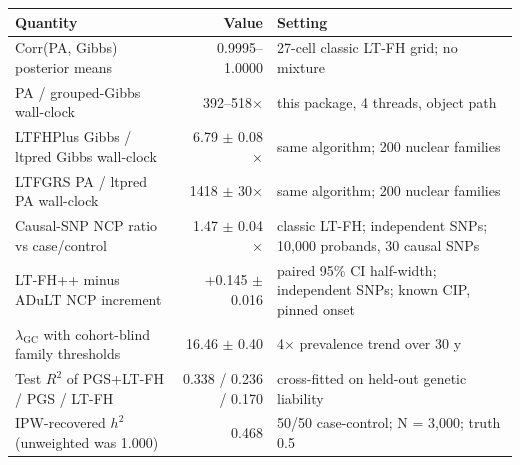 \begin{tabular}{@{}p{}rp{}@{}}
\toprule
Quantity & Value & Setting \\
\midrule
Corr(PA, Gibbs) posterior means & 0.9995--1.0000 & 27-cell classic LT-FH grid; no mixture \\
PA / grouped-Gibbs wall-clock & 392--518$\times$ & this package, 4 threads, object path \\
LTFHPlus Gibbs / ltpred Gibbs wall-clock & 6.79 $\pm$ 0.08$\times$ & same algorithm; 200 nuclear families \\
LTFGRS PA / ltpred PA wall-clock & 1418 $\pm$ 30$\times$ & same algorithm; 200 nuclear families \\
Causal-SNP NCP ratio vs case/control & 1.47 $\pm$ 0.04$\times$ & classic LT-FH; independent SNPs; 10,000 probands, 30 causal SNPs \\
LT-FH++ minus ADuLT NCP increment & +0.145 $\pm$ 0.016 & paired 95\% CI half-width; independent SNPs; known CIP, pinned onset \\
$\lambda_{\mathrm{GC}}$ with cohort-blind family thresholds & 16.46 $\pm$ 0.40 & 4$\times$ prevalence trend over 30 y \\
Test $R^2$ of PGS+LT-FH / PGS / LT-FH & 0.338 / 0.236 / 0.170 & cross-fitted on held-out genetic liability \\
IPW-recovered $h^2$ (unweighted was 1.000) & 0.468 & 50/50 case-control; N = 3,000; truth 0.5 \\
\bottomrule
\end{tabular}
